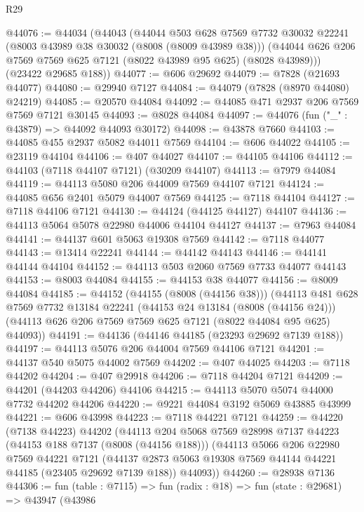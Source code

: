 \begin{lexlean}{R29}
\begin{coremodule}
@44076 := @44034
    (@44043
      (@44044
        @503
        @628
        @7569
        @7732
        @30032
        @22241
        (@8003 @43989 @38 @30032 (@8008 (@8009 @43989 @38)))
        (@44044 @626 @206 @7569 @7569 @625 @7121 (@8022 @43989 @95 @625) (@8028 @43989)))
      (@23422 @29685 @188))
@44077 := @606 @29692
@44079 := @7828 (@21693 @44077)
@44080 := @29940 @7127
@44084 := @44079 (@7828 (@8970 @44080) @24219)
@44085 := @20570 @44084
@44092 := @44085 @471 @2937 @206 @7569 @7569 @7121 @30145
@44093 := @8028 @44084
@44097 := @44076 (fun ("_" : @43879) => @44092 @44093 @30172)
@44098 := @43878 @7660
@44103 := @44085 @455 @2937 @5082 @44011 @7569
@44104 := @606 @44022
@44105 := @23119 @44104
@44106 := @407 @44027
@44107 := @44105 @44106
@44112 := @44103 (@7118 @44107 @7121) (@30209 @44107)
@44113 := @7979 @44084
@44119 := @44113 @5080 @206 @44009 @7569 @44107 @7121
@44124 := @44085 @656 @2401 @5079 @44007 @7569
@44125 := @7118 @44104
@44127 := @7118 @44106 @7121
@44130 := @44124 (@44125 @44127) @44107
@44136 := @44113 @5064 @5078 @22980 @44006 @44104 @44127
@44137 := @7963 @44084
@44141 := @44137 @601 @5063 @19308 @7569
@44142 := @7118 @44077
@44143 := @13414 @22241
@44144 := @44142 @44143
@44146 := @44141 @44144 @44104
@44152 := @44113 @503 @2060 @7569 @7733 @44077 @44143
@44153 := @8003 @44084
@44155 := @44153 @38 @44077
@44156 := @8009 @44084
@44185 := @44152
    (@44155 (@8008 (@44156 @38)))
    (@44113
      @481
      @628
      @7569
      @7732
      @13184
      @22241
      (@44153 @24 @13184 (@8008 (@44156 @24)))
      (@44113 @626 @206 @7569 @7569 @625 @7121 (@8022 @44084 @95 @625) @44093))
@44191 := @44136 (@44146 @44185 (@23293 @29692 @7139 @188))
@44197 := @44113 @5076 @206 @44004 @7569 @44106 @7121
@44201 := @44137 @540 @5075 @44002 @7569
@44202 := @407 @44025
@44203 := @7118 @44202
@44204 := @407 @29918
@44206 := @7118 @44204 @7121
@44209 := @44201 (@44203 @44206) @44106
@44215 := @44113 @5070 @5074 @44000 @7732 @44202 @44206
@44220 := @9221 @44084 @3192 @5069 @43885 @43999
@44221 := @606 @43998
@44223 := @7118 @44221 @7121
@44259 := @44220
    (@7138 @44223)
    @44202
    (@44113
      @204
      @5068
      @7569
      @28998
      @7137
      @44223
      (@44153 @188 @7137 (@8008 (@44156 @188)))
      (@44113
        @5066
        @206
        @22980
        @7569
        @44221
        @7121
        (@44137 @2873 @5063 @19308 @7569 @44144 @44221 @44185 (@23405 @29692 @7139 @188))
        @44093))
@44260 := @28938 @7136
@44306 := fun (table : @7115) =>
  fun (radix : @18) =>
  fun (state : @29681) =>
  @43947
    (@43986

\end{coremodule}
\end{lexlean}
